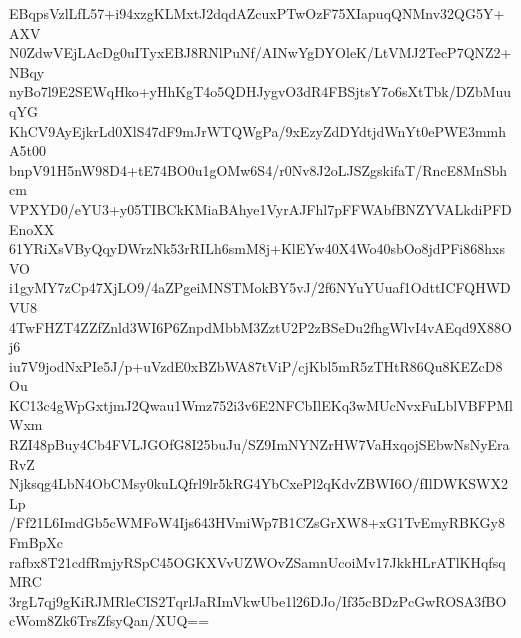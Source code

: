 EBqpsVzlLfL57+i94xzgKLMxtJ2dqdAZcuxPTwOzF75XIapuqQNMnv32QG5Y+AXV
N0ZdwVEjLAcDg0uITyxEBJ8RNlPuNf/AINwYgDYOleK/LtVMJ2TecP7QNZ2+NBqy
nyBo7l9E2SEWqHko+yHhKgT4o5QDHJygvO3dR4FBSjtsY7o6sXtTbk/DZbMuuqYG
KhCV9AyEjkrLd0XlS47dF9mJrWTQWgPa/9xEzyZdDYdtjdWnYt0ePWE3mmhA5t00
bnpV91H5nW98D4+tE74BO0u1gOMw6S4/r0Nv8J2oLJSZgskifaT/RncE8MnSbhcm
VPXYD0/eYU3+y05TIBCkKMiaBAhye1VyrAJFhl7pFFWAbfBNZYVALkdiPFDEnoXX
61YRiXsVByQqyDWrzNk53rRILh6smM8j+KlEYw40X4Wo40sbOo8jdPFi868hxsVO
i1gyMY7zCp47XjLO9/4aZPgeiMNSTMokBY5vJ/2f6NYuYUuaf1OdttICFQHWDVU8
4TwFHZT4ZZfZnld3WI6P6ZnpdMbbM3ZztU2P2zBSeDu2fhgWlvI4vAEqd9X88Oj6
iu7V9jodNxPIe5J/p+uVzdE0xBZbWA87tViP/cjKbl5mR5zTHtR86Qu8KEZcD8Ou
KC13c4gWpGxtjmJ2Qwau1Wmz752i3v6E2NFCbIlEKq3wMUcNvxFuLblVBFPMlWxm
RZI48pBuy4Cb4FVLJGOfG8I25buJu/SZ9ImNYNZrHW7VaHxqojSEbwNsNyEraRvZ
Njksqg4LbN4ObCMsy0kuLQfrl9lr5kRG4YbCxePl2qKdvZBWI6O/fIlDWKSWX2Lp
/Ff21L6ImdGb5cWMFoW4Ijs643HVmiWp7B1CZsGrXW8+xG1TvEmyRBKGy8FmBpXc
rafbx8T21cdfRmjyRSpC45OGKXVvUZWOvZSamnUcoiMv17JkkHLrATlKHqfsqMRC
3rgL7qj9gKiRJMRleCIS2TqrlJaRImVkwUbe1l26DJo/If35cBDzPcGwROSA3fBO
cWom8Zk6TrsZfsyQan/XUQ==
